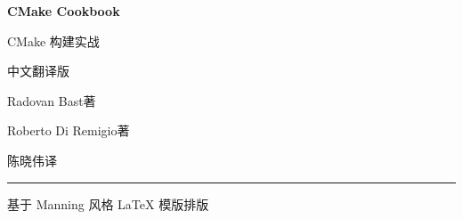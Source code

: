 \thispagestyle{empty}
\begingroup
\centering
\vspace*{1.6cm}
{\sffamily\fontsize{34bp}{40bp}\selectfont\bfseries\color{chapterblue} CMake Cookbook\par}
\vspace{10bp}
{\fontsize{16bp}{22bp}\selectfont CMake 构建实战\par}
\vspace{2bp}
{\fontsize{12bp}{17bp}\selectfont 中文翻译版\par}

\vspace{36bp}
{\fontsize{14bp}{20bp}\selectfont Radovan Bast\quad 著\par}
\vspace{6bp}
{\fontsize{14bp}{20bp}\selectfont Roberto Di Remigio\quad 著\par}
\vspace{6bp}
{\fontsize{14bp}{20bp}\selectfont 陈晓伟\quad 译\par}

\vfill
{%
  \color{chapterblue}\rule{0.62\textwidth}{1.4bp}\par
}
\vspace{10bp}
{\fontsize{11bp}{15bp}\selectfont 基于 Manning 风格 \LaTeX{} 模版排版\par}
\endgroup

